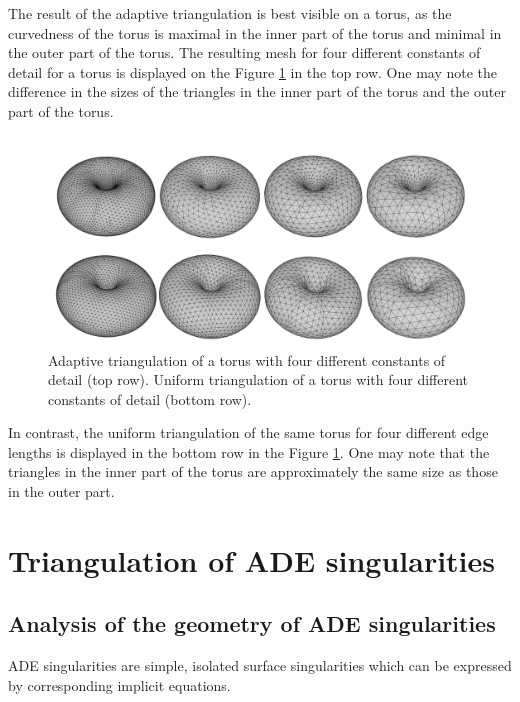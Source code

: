 The result of the adaptive triangulation is best visible on a torus, as the curvedness
of the torus is maximal in the inner part of the torus and minimal in the outer part of the torus.
The resulting mesh for four different constants of detail for a torus is displayed on the
Figure \ref{img:58} in the top row. One may note the difference in the sizes of the 
triangles in the inner
part of the torus and the outer part of the torus.

\begin{figure}[h!]
    \centerline{\includegraphics[scale=0.5]{images/img58}}
    \caption[Adaptive triangulation of a torus]
    {Adaptive triangulation of a torus with four different constants of detail (top row).
    Uniform triangulation of a torus with four different constants of detail (bottom row).}
    \label{img:58}
\end{figure}

In contrast, the uniform triangulation of the same torus for four different edge lengths
is displayed in the bottom row in the Figure \ref{img:58}. One may note that the 
triangles in the inner part of the torus are approximately the same 
size as those in the outer part.

\section{Triangulation of ADE singularities}
\label{sub3.2}

\subsection{Analysis of the geometry of ADE singularities}

ADE singularities are simple, isolated surface singularities which can be
expressed by corresponding implicit equations.

